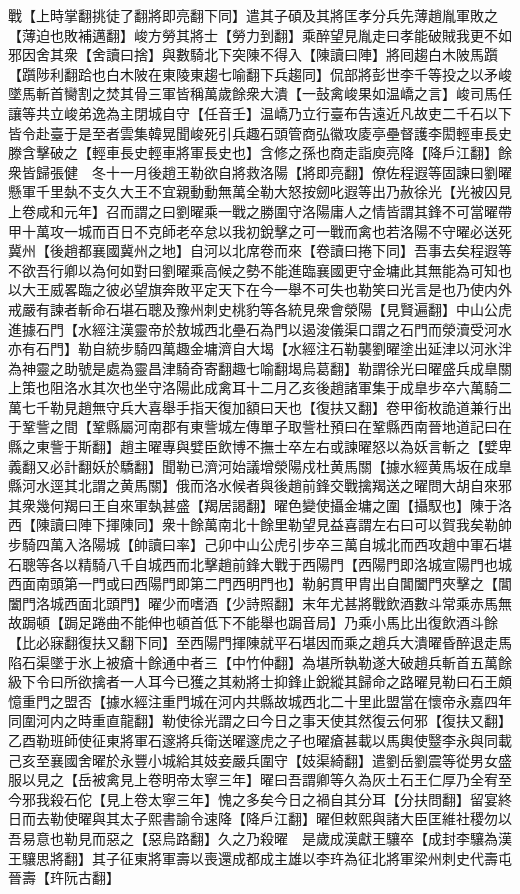 戰【上時掌翻挑徒了翻將即亮翻下同】遣其子碩及其將匡孝分兵先薄趙胤軍敗之【薄迫也敗補邁翻】峻方勞其將士【勞力到翻】乘醉望見胤走曰孝能破賊我更不如邪因舍其衆【舍讀曰捨】與數騎北下突陳不得入【陳讀曰陣】將囘趨白木陂馬躓【躓陟利翻跲也白木陂在東陵東趨七喻翻下兵趨同】侃部將彭世李千等投之以矛峻墜馬斬首臠割之焚其骨三軍皆稱萬歲餘衆大潰【一鼔禽峻果如温嶠之言】峻司馬任讓等共立峻弟逸為主閉城自守【任音壬】温嶠乃立行臺布告遠近凡故吏二千石以下皆令赴臺于是至者雲集韓晃聞峻死引兵趣石頭管商弘徽攻庱亭壘督護李閎輕車長史滕含擊破之【輕車長史輕車將軍長史也】含修之孫也商走詣庾亮降【降戶江翻】餘衆皆歸張健　冬十一月後趙王勒欲自將救洛陽【將即亮翻】僚佐程遐等固諫曰劉曜懸軍千里埶不支久大王不宜親動動無萬全勒大怒按劒叱遐等出乃赦徐光【光被囚見上卷咸和元年】召而謂之曰劉曜乘一戰之勝圍守洛陽庸人之情皆謂其鋒不可當曜帶甲十萬攻一城而百日不克師老卒怠以我初銳擊之可一戰而禽也若洛陽不守曜必送死冀州【後趙都襄國冀州之地】自河以北席卷而來【卷讀曰捲下同】吾事去矣程遐等不欲吾行卿以為何如對曰劉曜乘高候之勢不能進臨襄國更守金墉此其無能為可知也以大王威畧臨之彼必望旗奔敗平定天下在今一舉不可失也勒笑曰光言是也乃使内外戒嚴有諫者斬命石堪石聰及豫州刺史桃豹等各統見衆會滎陽【見賢遍翻】中山公虎進據石門【水經注漢靈帝於敖城西北壘石為門以遏浚儀渠口謂之石門而滎瀆受河水亦有石門】勒自統步騎四萬趣金墉濟自大堨【水經注石勒襲劉曜塗出延津以河氷泮為神靈之助號是處為靈昌津騎奇寄翻趣七喻翻堨烏葛翻】勒謂徐光曰曜盛兵成臯關上策也阻洛水其次也坐守洛陽此成禽耳十二月乙亥後趙諸軍集于成臯步卒六萬騎二萬七千勒見趙無守兵大喜舉手指天復加額曰天也【復扶又翻】卷甲銜枚詭道兼行出于鞏訾之間【鞏縣屬河南郡有東訾城左傳單子取訾杜預曰在鞏縣西南晉地道記曰在縣之東訾于斯翻】趙主曜專與嬖臣飲博不撫士卒左右或諫曜怒以為妖言斬之【嬖卑義翻又必計翻妖於驕翻】聞勒已濟河始議增滎陽戍杜黄馬關【據水經黄馬坂在成臯縣河水逕其北謂之黄馬關】俄而洛水候者與後趙前鋒交戰擒羯送之曜問大胡自來邪其衆幾何羯曰王自來軍埶甚盛【羯居謁翻】曜色變使攝金墉之圍【攝馭也】陳于洛西【陳讀曰陣下揮陳同】衆十餘萬南北十餘里勒望見益喜謂左右曰可以賀我矣勒帥步騎四萬入洛陽城【帥讀曰率】己卯中山公虎引步卒三萬自城北而西攻趙中軍石堪石聰等各以精騎八千自城西而北擊趙前鋒大戰于西陽門【西陽門即洛城宣陽門也城西面南頭第一門或曰西陽門即第二門西明門也】勒躬貫甲胄出自閶闔門夾擊之【閶闔門洛城西面北頭門】曜少而嗜酒【少詩照翻】末年尤甚將戰飲酒數斗常乘赤馬無故跼頓【跼足踡曲不能伸也頓首低下不能舉也跼音局】乃乘小馬比出復飲酒斗餘【比必寐翻復扶又翻下同】至西陽門揮陳就平石堪因而乘之趙兵大潰曜昏醉退走馬陷石渠墜于氷上被瘡十餘通中者三【中竹仲翻】為堪所執勒遂大破趙兵斬首五萬餘級下令曰所欲擒者一人耳今已獲之其勑將士抑鋒止銳縱其歸命之路曜見勒曰石王頗憶重門之盟否【據水經注重門城在河内共縣故城西北二十里此盟當在懷帝永嘉四年同圍河内之時重直龍翻】勒使徐光謂之曰今日之事天使其然復云何邪【復扶又翻】乙酉勒班師使征東將軍石邃將兵衛送曜邃虎之子也曜瘡甚載以馬輿使毉李永與同載己亥至襄國舍曜於永豐小城給其妓妾嚴兵圍守【妓渠綺翻】遣劉岳劉震等從男女盛服以見之【岳被禽見上卷明帝太寧三年】曜曰吾謂卿等久為灰土石王仁厚乃全宥至今邪我殺石佗【見上卷太寧三年】愧之多矣今日之禍自其分耳【分扶問翻】留宴終日而去勒使曜與其太子熙書諭令速降【降戶江翻】曜但敕熙與諸大臣匡維社稷勿以吾易意也勒見而惡之【惡烏路翻】久之乃殺曜　是歲成漢獻王驤卒【成封李驤為漢王驤思將翻】其子征東將軍壽以喪還成都成主雄以李玝為征北將軍梁州刺史代壽屯晉壽【玝阮古翻】

